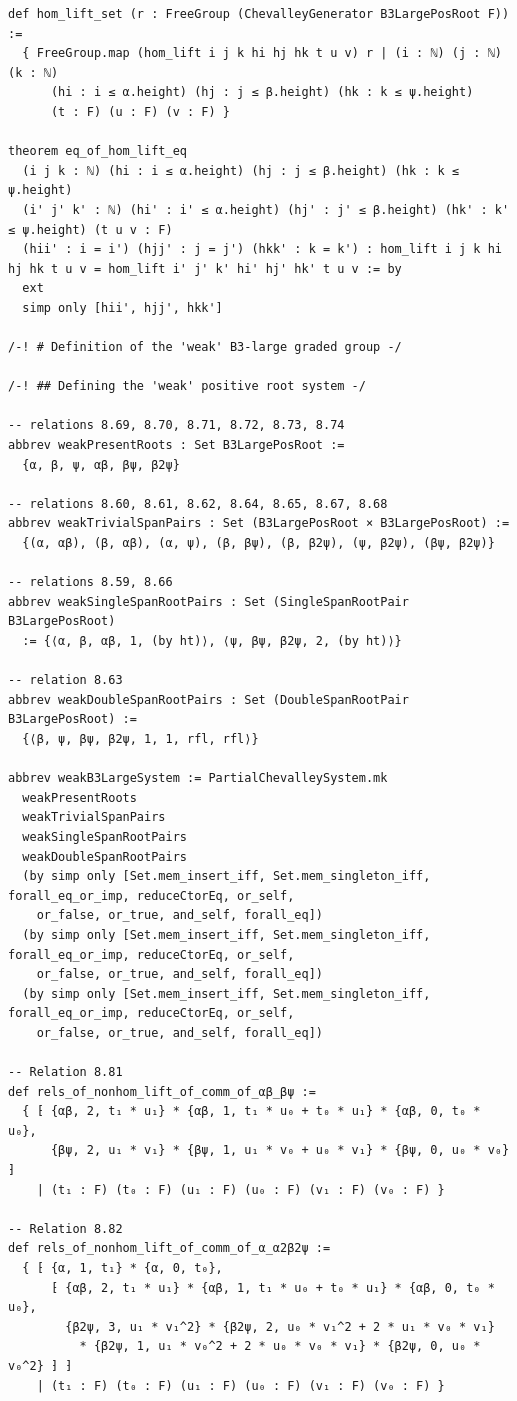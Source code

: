 \begin{Verbatim}
def hom_lift_set (r : FreeGroup (ChevalleyGenerator B3LargePosRoot F)) :=
  { FreeGroup.map (hom_lift i j k hi hj hk t u v) r | (i : ℕ) (j : ℕ) (k : ℕ)
      (hi : i ≤ α.height) (hj : j ≤ β.height) (hk : k ≤ ψ.height)
      (t : F) (u : F) (v : F) }

theorem eq_of_hom_lift_eq
  (i j k : ℕ) (hi : i ≤ α.height) (hj : j ≤ β.height) (hk : k ≤ ψ.height)
  (i' j' k' : ℕ) (hi' : i' ≤ α.height) (hj' : j' ≤ β.height) (hk' : k' ≤ ψ.height) (t u v : F)
  (hii' : i = i') (hjj' : j = j') (hkk' : k = k') : hom_lift i j k hi hj hk t u v = hom_lift i' j' k' hi' hj' hk' t u v := by
  ext
  simp only [hii', hjj', hkk']

/-! # Definition of the 'weak' B3-large graded group -/

/-! ## Defining the 'weak' positive root system -/

-- relations 8.69, 8.70, 8.71, 8.72, 8.73, 8.74
abbrev weakPresentRoots : Set B3LargePosRoot :=
  {α, β, ψ, αβ, βψ, β2ψ}

-- relations 8.60, 8.61, 8.62, 8.64, 8.65, 8.67, 8.68
abbrev weakTrivialSpanPairs : Set (B3LargePosRoot × B3LargePosRoot) :=
  {(α, αβ), (β, αβ), (α, ψ), (β, βψ), (β, β2ψ), (ψ, β2ψ), (βψ, β2ψ)}

-- relations 8.59, 8.66
abbrev weakSingleSpanRootPairs : Set (SingleSpanRootPair B3LargePosRoot)
  := {⟨α, β, αβ, 1, (by ht)⟩, ⟨ψ, βψ, β2ψ, 2, (by ht)⟩}

-- relation 8.63
abbrev weakDoubleSpanRootPairs : Set (DoubleSpanRootPair B3LargePosRoot) :=
  {⟨β, ψ, βψ, β2ψ, 1, 1, rfl, rfl⟩}

abbrev weakB3LargeSystem := PartialChevalleySystem.mk
  weakPresentRoots
  weakTrivialSpanPairs
  weakSingleSpanRootPairs
  weakDoubleSpanRootPairs
  (by simp only [Set.mem_insert_iff, Set.mem_singleton_iff, forall_eq_or_imp, reduceCtorEq, or_self,
    or_false, or_true, and_self, forall_eq])
  (by simp only [Set.mem_insert_iff, Set.mem_singleton_iff, forall_eq_or_imp, reduceCtorEq, or_self,
    or_false, or_true, and_self, forall_eq])
  (by simp only [Set.mem_insert_iff, Set.mem_singleton_iff, forall_eq_or_imp, reduceCtorEq, or_self,
    or_false, or_true, and_self, forall_eq])

-- Relation 8.81
def rels_of_nonhom_lift_of_comm_of_αβ_βψ :=
  { ⁅ {αβ, 2, t₁ * u₁} * {αβ, 1, t₁ * u₀ + t₀ * u₁} * {αβ, 0, t₀ * u₀},
      {βψ, 2, u₁ * v₁} * {βψ, 1, u₁ * v₀ + u₀ * v₁} * {βψ, 0, u₀ * v₀} ⁆
    | (t₁ : F) (t₀ : F) (u₁ : F) (u₀ : F) (v₁ : F) (v₀ : F) }

-- Relation 8.82
def rels_of_nonhom_lift_of_comm_of_α_α2β2ψ :=
  { ⁅ {α, 1, t₁} * {α, 0, t₀},
      ⁅ {αβ, 2, t₁ * u₁} * {αβ, 1, t₁ * u₀ + t₀ * u₁} * {αβ, 0, t₀ * u₀},
        {β2ψ, 3, u₁ * v₁^2} * {β2ψ, 2, u₀ * v₁^2 + 2 * u₁ * v₀ * v₁}
          * {β2ψ, 1, u₁ * v₀^2 + 2 * u₀ * v₀ * v₁} * {β2ψ, 0, u₀ * v₀^2} ⁆ ⁆
    | (t₁ : F) (t₀ : F) (u₁ : F) (u₀ : F) (v₁ : F) (v₀ : F) }


\end{Verbatim}
